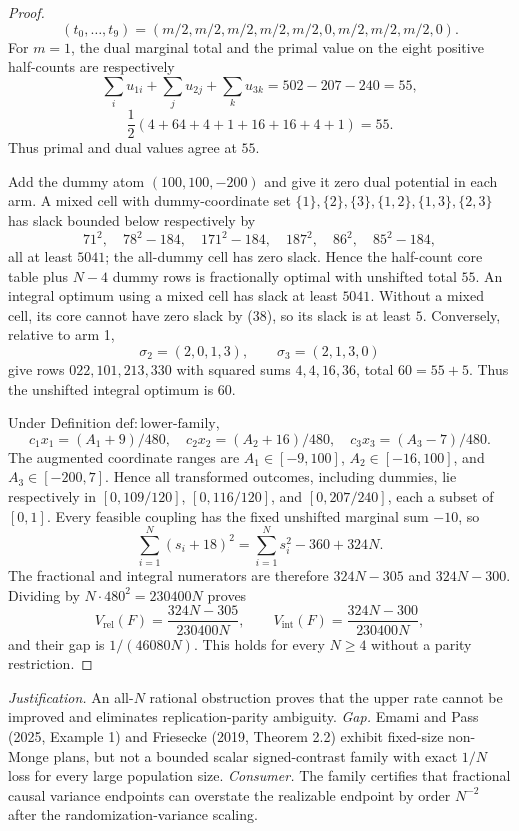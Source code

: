 \documentclass{article}
\begin{document}
\begin{proof}
\[
 (t_0,\ldots,t_9)=(m/2,m/2,m/2,m/2,m/2,0,m/2,m/2,m/2,0). \tag{38}
\]
For \(m=1\), the dual marginal total and the primal value on the eight positive half-counts are respectively
\[
 \sum_i u_{1i}+\sum_j u_{2j}+\sum_k u_{3k}=502-207-240=55,
\]
\[
 \frac12(4+64+4+1+16+16+4+1)=55. \tag{38a}
\]
Thus primal and dual values agree at \(55\).

Add the dummy atom \((100,100,-200)\) and give it zero dual potential in each arm.  A mixed cell with dummy-coordinate set \(\{1\},\{2\},\{3\},\{1,2\},\{1,3\},\{2,3\}\) has slack bounded below respectively by
\[
 71^2,\quad 78^2-184,\quad 171^2-184,\quad 187^2,\quad 86^2,\quad 85^2-184,
\]
all at least \(5041\); the all-dummy cell has zero slack.  Hence the half-count core table plus \(N-4\) dummy rows is fractionally optimal with unshifted total \(55\).  An integral optimum using a mixed cell has slack at least \(5041\).  Without a mixed cell, its core cannot have zero slack by (38), so its slack is at least \(5\).  Conversely, relative to arm 1,
\[
 \sigma_2=(2,0,1,3),\qquad \sigma_3=(2,1,3,0)
\]
give rows \(022,101,213,330\) with squared sums \(4,4,16,36\), total \(60=55+5\).  Thus the unshifted integral optimum is \(60\).

Under Definition \(\mathrm{def{:}lower\mbox{-}family}\),
\[
 c_1x_1=(A_1+9)/480,\quad c_2x_2=(A_2+16)/480,\quad
 c_3x_3=(A_3-7)/480.
\]
The augmented coordinate ranges are \(A_1\in[-9,100]\), \(A_2\in[-16,100]\), and \(A_3\in[-200,7]\).  Hence all transformed outcomes, including dummies, lie respectively in \([0,109/120]\), \([0,116/120]\), and \([0,207/240]\), each a subset of \([0,1]\).  Every feasible coupling has the fixed unshifted marginal sum \(-10\), so
\[
 \sum_{i=1}^N(s_i+18)^2=\sum_{i=1}^Ns_i^2-360+324N. \tag{39}
\]
The fractional and integral numerators are therefore \(324N-305\) and \(324N-300\).  Dividing by \(N\cdot480^2=230400N\) proves
\[
 V_{\mathrm{rel}}(F)=\frac{324N-305}{230400N},\qquad
 V_{\mathrm{int}}(F)=\frac{324N-300}{230400N},
\]
and their gap is \(1/(46080N)\).  This holds for every \(N\ge4\) without a parity restriction.
\end{proof}
\par\smallskip\noindent \textit{Justification.} An all-\(N\) rational obstruction proves that the upper rate cannot be improved and eliminates replication-parity ambiguity. \textit{Gap.} Emami and Pass (2025, Example 1) and Friesecke (2019, Theorem 2.2) exhibit fixed-size non-Monge plans, but not a bounded scalar signed-contrast family with exact \(1/N\) loss for every large population size. \textit{Consumer.} The family certifies that fractional causal variance endpoints can overstate the realizable endpoint by order \(N^{-2}\) after the randomization-variance scaling.
\end{document}

